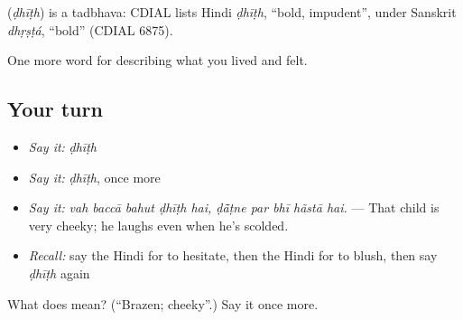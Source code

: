 \begin{cousinweb}
\textbf{} (\emph{ḍhīṭh}) is a tadbhava: CDIAL lists Hindi \emph{ḍhīṭh}, \textquotedblleft{}bold, impudent\textquotedblright{}, under Sanskrit \emph{dhṛṣṭá}, \textquotedblleft{}bold\textquotedblright{} (CDIAL 6875).
\end{cousinweb}

\begin{grammarlens}[title={What you've built}]
One more word for describing what you lived and felt.
\end{grammarlens}

\subsection*{Your turn}
\begin{itemize}
\raggedright
  \item \emph{Say it:} \emph{ḍhīṭh}
  \item \emph{Say it:} \emph{ḍhīṭh}, once more
  \item \emph{Say it:} \emph{vah baccā bahut ḍhīṭh hai, ḍā̃ṭne par bhī hãstā hai.} — That child is very cheeky; he laughs even when he's scolded.
  \item \emph{Recall:} say the Hindi for to hesitate, then the Hindi for to blush, then say \emph{ḍhīṭh} again
\end{itemize}

\begin{tcolorbox}[breakable,colback=teal!4,colframe=teal!35!black,title={Before you move on}]
What does  mean? (\textquotedblleft{}Brazen; cheeky\textquotedblright{}.) Say it once more.
\end{tcolorbox}
